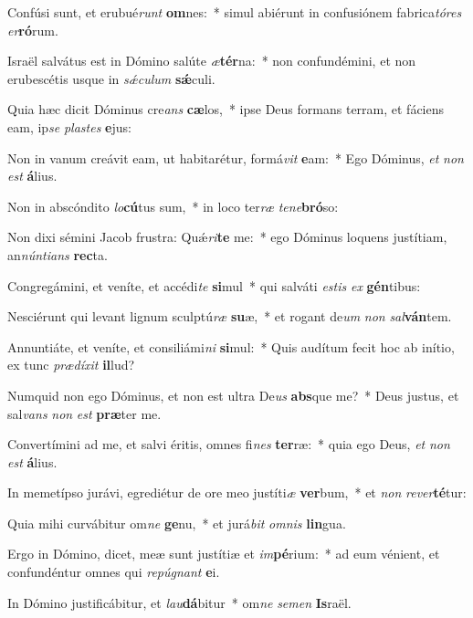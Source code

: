 \item Confúsi sunt, et erubué\textit{runt} \textbf{om}nes:~* simul abiérunt in confusiónem fabrica\textit{tó}\textit{res} \textit{er}\textbf{ró}rum.
\item Israël salvátus est in Dómino salúte \textit{æ}\textbf{tér}na:~* non confundémini, et non erubescétis usque in \textit{sǽ}\textit{cu}\textit{lum} \textbf{sǽ}culi.
\item Quia hæc dicit Dóminus cre\textit{ans} \textbf{cæ}los,~* ipse Deus formans terram, et fáciens eam, ip\textit{se} \textit{plas}\textit{tes} \textbf{e}jus:
\item Non in vanum creávit eam, ut habitarétur, formá\textit{vit} \textbf{e}am:~* Ego Dóminus, \textit{et} \textit{non} \textit{est} \textbf{á}lius.
\item Non in abscóndito \textit{lo}\textbf{cú}tus sum,~* in loco ter\textit{ræ} \textit{te}\textit{ne}\textbf{bró}so:
\item Non dixi sémini Jacob frustra: Quǽ\textit{ri}\textbf{te} me:~* ego Dóminus loquens justítiam, an\textit{nún}\textit{ti}\textit{ans} \textbf{rec}ta.
\item Congregámini, et veníte, et accédi\textit{te} \textbf{si}mul~* qui salváti \textit{es}\textit{tis} \textit{ex} \textbf{gén}tibus:
\item Nesciérunt qui levant lignum sculptú\textit{ræ} \textbf{su}æ,~* et rogant de\textit{um} \textit{non} \textit{sal}\textbf{ván}tem.
\item Annuntiáte, et veníte, et consiliámi\textit{ni} \textbf{si}mul:~* Quis audítum fecit hoc ab inítio, ex tunc \textit{præ}\textit{dí}\textit{xit} \textbf{il}lud?
\item Numquid non ego Dóminus, et non est ultra De\textit{us} \textbf{abs}que me?~* Deus justus, et sal\textit{vans} \textit{non} \textit{est} \textbf{præ}ter me.
\item Convertímini ad me, et salvi éritis, omnes fi\textit{nes} \textbf{ter}ræ:~* quia ego Deus, \textit{et} \textit{non} \textit{est} \textbf{á}lius.
\item In memetípso jurávi, egrediétur de ore meo justíti\textit{æ} \textbf{ver}bum,~* et \textit{non} \textit{re}\textit{ver}\textbf{té}tur:
\item Quia mihi curvábitur om\textit{ne} \textbf{ge}nu,~* et jurá\textit{bit} \textit{om}\textit{nis} \textbf{lin}gua.
\item Ergo in Dómino, dicet, meæ sunt justítiæ et \textit{im}\textbf{pé}rium:~* ad eum vénient, et confundéntur omnes qui \textit{re}\textit{pú}\textit{gnant} \textbf{e}i.
\item In Dómino justificábitur, et \textit{lau}\textbf{dá}bitur~* om\textit{ne} \textit{se}\textit{men} \textbf{Is}raël.
